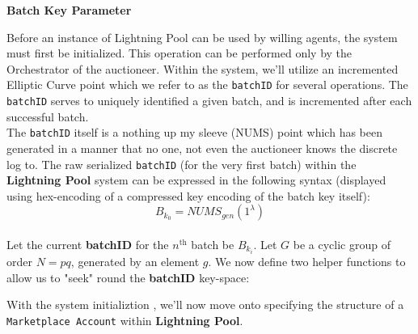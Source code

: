\documentclass[10pt,a4paper]{article}
\theoremstyle{definition}
\begin{document}
\begin{center}
    \textbf{Batch Key Parameter}
\end{center}

Before an instance of Lightning Pool can be used by willing agents, the system
must first be initialized. This operation can be performed only by the
Orchestrator of the auctioneer. Within the system, we'll utilize an incremented
Elliptic Curve point which we refer to as the \texttt{batchID} for several
operations. The \texttt{batchID} serves to uniquely identified a given batch,
and is incremented after each successful batch. \\

The \texttt{batchID} itself is a nothing up my sleeve (NUMS) point which has
been generated in a manner that no one, not even the auctioneer knows the
discrete log to. The raw serialized \texttt{batchID} (for the very first batch)
within the \textbf{Lightning Pool} system can be expressed in the following
syntax (displayed using hex-encoding of a compressed key encoding of the batch
key itself): \\
\[
    B_{k_0} = NUMS_{gen}(1^\lambda)
\] \\

Let the current \textbf{batchID} for the $n^{\text{th}}$ batch be $B_{k_i}$.
Let $G$ be a cyclic group of order $N=pq$, generated by an element $g$.  We now
define two helper functions to allow us to "seek" round the \textbf{batchID}
key-space:
\begin{pcvstack}[boxed,center, space=1em]
     \begin{pchstack}

     \end{pchstack}

     \begin{center}
     \end{center}
\end{pcvstack} %

With the system initializtion , we'll now move onto specifying the structure of
a \texttt{Marketplace Account} within \textbf{Lightning Pool}.
\end{document}
